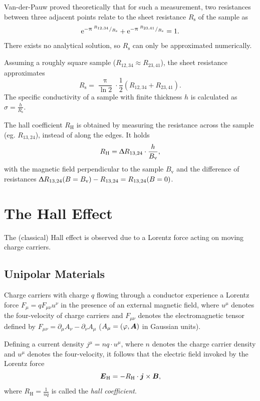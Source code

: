 Van-der-Pauw proved theoretically that for such a measurement, two resistances between three adjacent points relate to the sheet resistance $R_\text{s}$ of the sample as
\begin{equation}
	\mathrm{e}^{- \uppi \; ^{R_{12,34}}/_{R_\text{s}}} + \mathrm{e}^{- \uppi \; ^{R_{23,41}}/_{R_\text{s}}} = 1.
\end{equation}
There exists no analytical solution, so $R_\text{s}$ can only be approximated numerically.

Assuming a roughly square sample ($R_{12,34} \approx R_{23,41}$), the sheet resistance approximates
\begin{equation*}
	R_\text{s} = \frac{\uppi}{\ln 2} \cdot \frac{1}{2} \left( R_{12,34} + R_{23,41} \right).
\end{equation*}
The specific conductivity of a sample with finite thickness $h$ is calculated as $\sigma = \frac{h}{R_\text{s}}$.

The hall coefficient $R_\text{H}$ is obtained by measuring the resistance across the sample (eg. $R_{13,24}$), instead of along the edges.
It holds
\begin{equation*}
	R_\text{H} = \Updelta R_{13,24} \cdot \frac{h}{B_\text{v}},
\end{equation*}
with the magnetic field perpendicular to the sample $B_\text{v}$ and the difference of resistances $\Updelta R_{13,24}(B = B_\text{v}) - R_{13,24} = R_{13,24}(B = 0)$.

\section{The Hall Effect}
The (classical) Hall effect is observed due to a Lorentz force acting on moving charge carriers.

\subsection{Unipolar Materials}
Charge carriers with charge $q$ flowing through a conductor experience a Lorentz force $F_\mu = qF_{\mu\nu}u^\nu$ in the presence of an external magnetic field, where $u^\mu$ denotes the four-velocity of charge carriers and $F_{\mu\nu}$ denotes the electromagnetic tensor defined by $F_{\mu\nu} = \partial_\mu A_\nu - \partial_\nu A_\mu$ ($A_\mu = \left(\varphi, \boldsymbol{A}\right)$ in Gaussian units).

Defining a current density $j^\mu = nq\cdot u^\mu$, where $n$ denotes the charge carrier density and $u^\mu$ denotes the four-velocity, it follows that the electric field invoked by the Lorentz force
\begin{equation} \label{eq:hall-field}
	\boldsymbol{E}_\text{H} = -R_ \text{H}\cdot\boldsymbol{j}\times\boldsymbol{B},
\end{equation}
where $R_\text{H} = \frac{1}{nq}$ is called the \textit{hall coefficient}.

